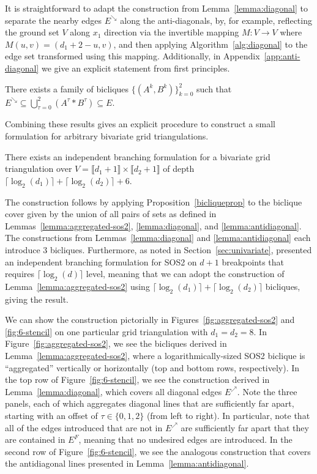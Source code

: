 \documentclass[opre,nonblindrev]{informs3} %
\begin{document}
{It is straightforward to adapt the construction from Lemma~\ref{lemma:diagonal} to separate the nearby edges $E^\searrow$ along the anti-diagonals, by, for example, reflecting the ground set $V$ along $x_1$ direction via the invertible mapping $M: V \to V$ where $M(u,v) = (d_1+2-u,v)$, and then applying Algorithm~\ref{alg:diagonal} to the edge set transformed using this mapping. Additionally, in Appendix~\ref{app:anti-diagonal} we give an explicit statement from first principles.

\begin{lemma} \label{lemma:antidiagonal}
    There exists a family of bicliques $\{(A^k,B^k)\}_{k=0}^2$ such that $E^\searrow \subseteq \bigcup_{\tau=0}^2 (A^\tau * B^\tau) \subseteq E$.
\end{lemma}

Combining these results gives an explicit procedure to construct a small formulation for arbitrary bivariate grid triangulations.

\begin{theorem}
    There exists an independent branching formulation for a bivariate grid triangulation over $V = \llbracket d_1 + 1 \rrbracket \times \llbracket d_2 + 1 \rrbracket$ of depth $\lceil \log_2(d_1) \rceil + \lceil \log_2(d_2) \rceil + 6$. 
\end{theorem}
The construction follows by applying Proposition~\ref{bicliqueprop} to the biclique cover given by the union of all pairs of sets as defined in Lemmas~\ref{lemma:aggregated-sos2}, \ref{lemma:diagonal}, and \ref{lemma:antidiagonal}. The constructions from Lemmas~\ref{lemma:diagonal} and \ref{lemma:antidiagonal} each introduce 3 bicliques. Furthermore, as noted in Section~\ref{sec:univariate}, \cite{Vielma:2009a} presented an independent branching formulation for SOS2 on $d+1$ breakpoints that requires $\lceil \log_2(d) \rceil$ level, meaning that we can adopt the construction of Lemma~\ref{lemma:aggregated-sos2} using $\lceil \log_2(d_1) \rceil + \lceil \log_2(d_2) \rceil$ bicliques, giving the result.
\Halmos\endproof

We can show the construction pictorially in Figures~\ref{fig:aggregated-sos2} and \ref{fig:6-stencil} on one particular grid triangulation with $d_1 = d_2 = 8$. In Figure~\ref{fig:aggregated-sos2}, we see the bicliques derived in Lemma~\ref{lemma:aggregated-sos2}, where a logarithmically-sized SOS2 biclique is ``aggregated'' vertically or horizontally (top and bottom rows, respectively). In the top row of Figure~\ref{fig:6-stencil}, we see the construction derived in Lemma~\ref{lemma:diagonal}, which covers all diagonal edges $E^\nearrow$. Note the three panels, each of which aggregates diagonal lines that are sufficiently far apart, starting with an offset of $\tau \in \{0,1,2\}$ (from left to right). In particular, note that all of the edges introduced that are not in $E^\nearrow$ are sufficiently far apart that they are contained in $E^F$, meaning that no undesired edges are introduced. In the second row of Figure~\ref{fig:6-stencil}, we see the analogous construction that covers the antidiagonal lines presented in Lemma~\ref{lemma:antidiagonal}.
}
\end{document}
